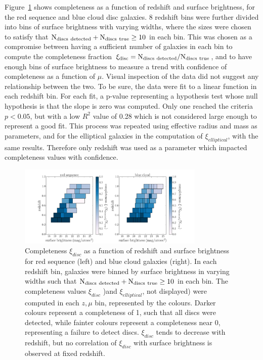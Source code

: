 \documentclass[useAMS,usenatbib]{mn2e}
\begin{document}
Figure~\ref{fig:xi_v_sb} shows completeness as a function of redshift and surface brightness, for the red sequence and blue cloud disc galaxies. 8 redshift bins were further divided into bins of surface brightness with varying widths, where the sizes were chosen to satisfy that $\rm N_{discs~detected} + N_{discs~true} \ge 10$ in each bin. This was chosen as a compromise between having a sufficient number of galaxies in each bin to compute the completeness fraction $\rm \xi_{disc} = N_{discs~detected}/N_{discs~true}$, and to have enough bins of surface brightness to measure a trend with confidence of completeness as a function of $\mu$. Visual inspection of the data did not suggest any relationship between the two. To be sure, the data were fit to a linear function in each redshift bin. For each fit, a p-value representing a hypothesis test whose null hypothesis is that the slope is zero was computed. Only one reached the criteria $p<0.05$, but with a low $R^{2}$ value of 0.28 which is not considered large enough to represent a good fit. This process was repeated using effective radius and mass as parameters, and for the elliptical galaxies in the computation of $\xi_{elliptical}$, with the same results. Therefore only redshift was used as a parameter which impacted completeness values with confidence. 

\begin{figure}
\centering
\includegraphics[width=3.5in,trim={3cm 0cm 3cm 0cm},clip]{figures/xi_v_sb.pdf}
\caption{Completeness $\xi_{disc}$ as a function of redshift and surface brightness for red sequence (left) and blue cloud galaxies (right). In each redshift bin, galaxies were binned by surface brightness in varying widths such that $\rm N_{discs~detected} + N_{discs~true} \ge 10$ in each bin. The completeness values $\xi_{disc}$ )and $\xi_{elliptical}$, not displayed) were computed in each $z,\mu$ bin, represented by the colours. Darker colours represent a completeness of 1, such that all discs were detected, while fainter colours represent a completeness near 0, representing a failure to detect discs. $\xi_{disc}$ tends to decrease with redshift, but no correlation of $\xi_{disc}$ with surface brightness is observed at fixed redshift.}
\label{fig:xi_v_sb}
\end{figure}
\end{document}
